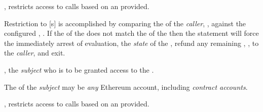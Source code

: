 \begin{code}
  \item \operations
  \begin{modifiers}
    \item {}, restricts access to  calls
      based on an  provided.

      \begin{displayquote}
        Restriction to [s] is accomplished by comparing the
         of the  \emph{caller}, ,
        against the configured , . If the
         of the  does not match the
         of the  then the  statement
        will force the immediately arrest of  evaluation,
         the \emph{state} of the , refund any
        remaining , , to the \emph{caller}, and
        exit.\footnotemark{}

      \end{displayquote}


      \begin{parameters}
      \item {}, the \emph{subject} who is to be granted
        access to the .

        \begin{displayquote}
          The  of the \emph{subject} may be \emph{any} Ethereum
          account, including \emph{contract accounts}.
        \end{displayquote}
      \end{parameters}

    \item {}, restricts access to
       calls based on an  provided.


\end{modifiers}
\end{code}
